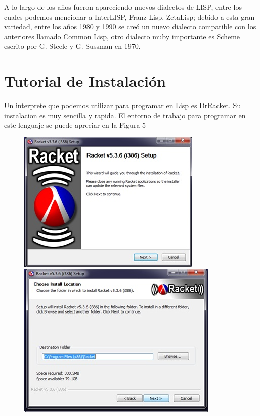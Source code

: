 \documentclass[11pt]{article} %
\begin{document}
A lo largo de los años fueron apareciendo nuevos dialectos de LISP, entre los cuales podemos
mencionar a InterLISP, Franz Lisp,  ZetaLisp; debido a esta gran variedad, entre los años 1980 y 
1990 se creó un nuevo dialecto compatible con los anteriores llamado Common Lisp, otro 
dialecto muby importante es Scheme escrito por G. Steele y G. Sussman  en 1970.\\


	
\section{Tutorial de Instalación}
Un interprete que podemos utilizar para programar en Lisp es DrRacket. Su instalacion es muy sencilla y rapida.
El entorno de trabajo para programar en este lenguaje se puede apreciar en la Figura 5

\begin{figure}[H]
 \begin{center}
    \includegraphics{imagenes_investigacion/paso_uno.jpg}
\end{center}
\caption {}
\label{Figura 1}

\begin{center}
  \includegraphics{imagenes_investigacion/paso_dos.jpg}
\end{center}
\caption { }
\label{Figura 2}
\end{figure}
\end{document}
